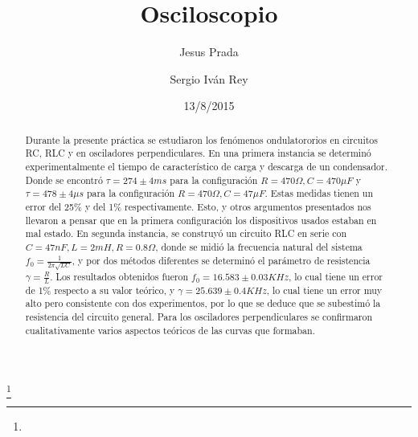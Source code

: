\documentclass[%
 reprint,
 amsmath,amssymb,
 aps,
]{revtex4-1}
\begin{document}

\title{Osciloscopio}%
\thanks{}%

\author{Jesus Prada}
\author{Sergio Iv\'an Rey}%
%

\date{13/8/2015}%

\begin{abstract}
Durante la presente práctica se estudiaron los fen\'omenos ondulatororios en circuitos RC, RLC y en osciladores perpendiculares. En una primera instancia se determin\'o experimentalmente el tiempo de caracter\'istico de carga y descarga de un condensador. Donde se encontró $\tau = 274 \pm 4ms$ para la configuración $ R = 470\Omega, C = 470\mu F$  y $\tau = 478 \pm4\mu s$ para la configuración $ R = 470\Omega, C = 47\mu F$. Estas medidas tienen un error del 25\%  y del 1\% respectivamente. Esto, y otros argumentos presentados nos llevaron a pensar que en la primera configuración los dispositivos usados estaban en mal estado. En segunda instancia, se construy\'o un circuito RLC en serie  con $C=47nF, L = 2mH, R= 0.8\Omega$, donde se midió la frecuencia natural del sistema $f_0 = \frac{1}{2\pi\sqrt{LC}}$, y por dos m\'etodos diferentes se determin\'o el parámetro de resistencia $\gamma = \frac{R}{L}$. Los resultados obtenidos fueron $f_0 =  16.583 \pm 0.03KHz$, lo cual tiene un error de 1\% respecto a su valor teórico, y $\gamma = 25.639 \pm 0.4 KHz $, lo cual tiene un error muy alto pero consistente con dos experimentos, por lo que se deduce que se subestimó la resistencia del circuito general. Para los osciladores perpendiculares se confirmaron cualitativamente varios aspectos teóricos de las curvas que formaban.\\
\end{abstract}


\maketitle
\end{document}
